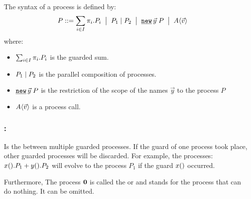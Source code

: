 \begin{definition}
\label{def_process_syntax}
The syntax of a \picalc{} process  is defined by: 
\begin{align*}
 P & \syntdef \procsum \ebnf \procpar{P_1}{P_2} \ebnf \procres{\vec{y}}{P} \ebnf \proccall{A}{\vec{v}}
\end{align*}
where:
\begin{itemize}
\item $\sum_{i\in I}{\pi_i.P_i}$ is the guarded sum.
\item $P_1 \mid P_2$ is the parallel composition of processes.
\item $\procres{\vec{y}}{P}$ is the restriction of the scope of the names $\vec{y}$ to the process $P$
\item $A\langle\vec{v}\rangle$ is a process call. 
\end{itemize}
\end{definition}

\subsubsection{:} Is the  between multiple guarded processes. If the guard of one process took place, other guarded processes will be discarded. For example, the processes: $x().P_1 + y().P_2$ will evolve to the process $P_1$ if the guard $x()$ occurred.

Furthermore, The process $\mathbf{0}$ is called the  or  and stands for the process that can do nothing. It can be omitted.
